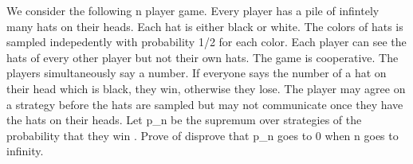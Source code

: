 We consider the following n player game. Every player has a pile of infintely many hats on their heads. Each hat is either black or white. The colors of hats is sampled indepedently with probability 1/2 for each color. Each player can see the hats of every other player but not their own hats. The game is cooperative. The players simultaneously say a number. If everyone says the number of a hat on their head which is black, they win, otherwise they lose. The player may agree on a strategy before the hats are sampled but may not communicate once they have the hats on their heads. Let p_n be the supremum over strategies of the probability that they win . Prove of disprove that p_n goes to 0 when n goes to infinity.
